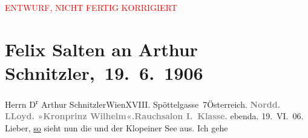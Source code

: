 
\begin{center}
            \textcolor{red}{ENTWURF, NICHT FERTIG KORRIGIERT}
                      \end{center}
            
         
         \renewcommand{\erwaehntePersonen}{Personen: Anna Katharina Rehmann, Ottilie Salten, Paul Salten}
         \renewcommand{\erwaehnteInstitutionen}{Institutionen: Deutsch-amerikanische Seepost, Kronprinz Wilhelm, Norddeutscher Lloyd}
         \renewcommand{\erwaehnteOrte}{Orte: Bansin, Berlin, Dänemark, Edmund-Weiß-Gasse 7, England, Heringsdorf, Klopeiner See, Marienlyst, Nordsee, Wien, Österreich}
         \renewcommand{\erwaehnteWerke}{}
               \section[ Felix Salten an Arthur Schnitzler, 19. 6. 1906]{ Felix Salten an Arthur Schnitzler, 19. 6. 1906}\nopagebreak{}\rehead{ }\begin{ledgroupsized}[t]{13cm}\normalsize\beginnumbering \toendnotes[C]{\smallbreak\pagebreak[2]} 
\toendnotes[C]{\smallbreak}\pstart{}{\pb}Herrn D\textsuperscript{r} Arthur Schnitzler\pend{}\pstart{}Wien\pend{}\pstart{}XVIII. Spöttelgasse 7\pend{}\pstart{}Österreich.\pend{}{\bigskip}\pstart
           \noindent{}{\pb}\textcolor{gray}{\textbf{Nordd. LLoyd. »Kronprinz Wilhelm«.}}\hfill \textcolor{gray}{\textbf{Rauchsalon I. Klasse.}}\pend
           \pstart
           \raggedleft{}ebenda. 19. VI. 06.\pend
           \pstart
           Lieber,{ }\uline{so} sieht nun die \label{K_L03427-1v}\label{K_L03427-1h} und der Klopeiner See aus. Ich gehe

\end{ledgroupsized}
